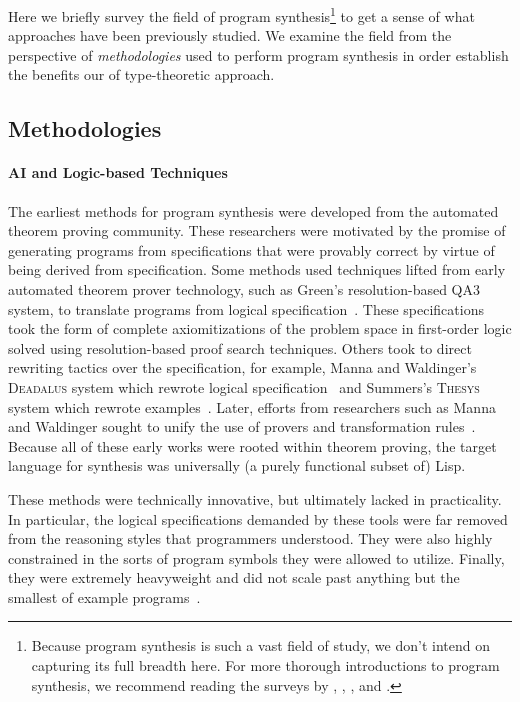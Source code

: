 Here we briefly survey the field of program synthesis\footnote{%
  Because program synthesis is such a vast field of study, we don't intend on capturing its full breadth here.
  For more thorough introductions to program synthesis, we recommend reading the surveys by \citet{kreitz-automated-deduction-1998}, \citet{flener-jlp-1999}, \citet{gulwani-ppdp-2010}, and \citet{kitzelmann-aaip-2010}.
} to get a sense of what approaches have been previously studied.
We examine the field from the perspective of \emph{methodologies} used to perform program synthesis in order establish the benefits our of type-theoretic approach.

\subsection{Methodologies}
\label{subsec:methodologies}

\paragraph{AI and Logic-based Techniques}

The earliest methods for program synthesis were developed from the automated theorem proving community.
These researchers were motivated by the promise of generating programs from specifications that were provably correct by virtue of being derived from specification.
Some methods used techniques lifted from early automated theorem prover technology, such as Green's resolution-based \textsc{QA3} system, to translate programs from logical specification~\citep{green-ijcai-1969}.
These specifications took the form of complete axiomitizations of the problem space in first-order logic solved using resolution-based proof search techniques.
Others took to direct rewriting tactics over the specification, for example, Manna and Waldinger's \textsc{Deadalus} system which rewrote logical specification~\citep{manna-tse-1979} and Summers's \textsc{Thesys} system which rewrote examples~\citep{summers-popl-1976}.
Later, efforts from researchers such as Manna and Waldinger sought to unify the use of provers and transformation rules~\citep{manna-plas-1980}.
Because all of these early works were rooted within theorem proving, the target language for synthesis was universally (a purely functional subset of) Lisp.

These methods were technically innovative, but ultimately lacked in practicality.
In particular, the logical specifications demanded by these tools were far removed from the reasoning styles that programmers understood.
They were also highly constrained in the sorts of program symbols they were allowed to utilize.
Finally, they were extremely heavyweight and did not scale past anything but the smallest of example programs~\citep{kreitz-automated-deduction-1998}.

